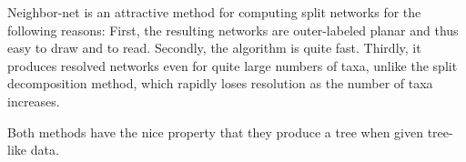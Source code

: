 \documentclass[./main.tex]{subfiles}
\begin{document}
\begin{displayquote}
    Neighbor-net is an attractive method for computing split networks for the following reasons: First, the resulting networks are outer-labeled planar and thus easy to draw and to read. Secondly, the algorithm is quite fast. Thirdly, it produces resolved networks even for quite large numbers of taxa, unlike the split decomposition method, which rapidly loses resolution as the number of taxa increases.
\end{displayquote}

Both methods have the nice property that they produce a tree when given tree-like data.
\end{document}
